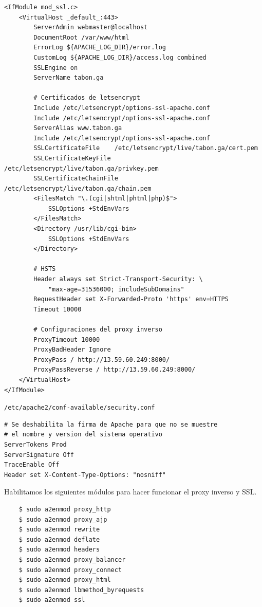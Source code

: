 \documentclass[9pt]{article}
\begin{document}
\begin{verbatim}
<IfModule mod_ssl.c>
    <VirtualHost _default_:443>
        ServerAdmin webmaster@localhost
        DocumentRoot /var/www/html
        ErrorLog ${APACHE_LOG_DIR}/error.log
        CustomLog ${APACHE_LOG_DIR}/access.log combined
        SSLEngine on
        ServerName tabon.ga

        # Certificados de letsencrypt
        Include /etc/letsencrypt/options-ssl-apache.conf
        Include /etc/letsencrypt/options-ssl-apache.conf
        ServerAlias www.tabon.ga
        Include /etc/letsencrypt/options-ssl-apache.conf
        SSLCertificateFile    /etc/letsencrypt/live/tabon.ga/cert.pem
        SSLCertificateKeyFile    /etc/letsencrypt/live/tabon.ga/privkey.pem
        SSLCertificateChainFile    /etc/letsencrypt/live/tabon.ga/chain.pem
        <FilesMatch "\.(cgi|shtml|phtml|php)$">
            SSLOptions +StdEnvVars
        </FilesMatch>
        <Directory /usr/lib/cgi-bin>
            SSLOptions +StdEnvVars
        </Directory>

        # HSTS
        Header always set Strict-Transport-Security: \
            "max-age=31536000; includeSubDomains"
        RequestHeader set X-Forwarded-Proto 'https' env=HTTPS        
        Timeout 10000

        # Configuraciones del proxy inverso
        ProxyTimeout 10000
        ProxyBadHeader Ignore
        ProxyPass / http://13.59.60.249:8000/
        ProxyPassReverse / http://13.59.60.249:8000/
    </VirtualHost>
</IfModule>
\end{verbatim}

\texttt{/etc/apache2/conf-available/security.conf}

\begin{verbatim}
# Se deshabilita la firma de Apache para que no se muestre
# el nombre y version del sistema operativo
ServerTokens Prod
ServerSignature Off
TraceEnable Off
Header set X-Content-Type-Options: "nosniff"
\end{verbatim}

Habilitamos los siguientes módulos para hacer funcionar el proxy inverso y \textsf{SSL}.

\begin{verbatim}
    $ sudo a2enmod proxy_http
    $ sudo a2enmod proxy_ajp
    $ sudo a2enmod rewrite
    $ sudo a2enmod deflate
    $ sudo a2enmod headers
    $ sudo a2enmod proxy_balancer
    $ sudo a2enmod proxy_connect
    $ sudo a2enmod proxy_html
    $ sudo a2enmod lbmethod_byrequests
    $ sudo a2enmod ssl
\end{verbatim}
\end{document}
